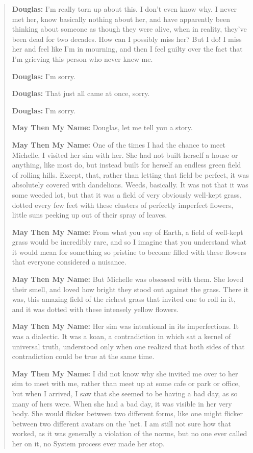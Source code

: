 \begin{quote}
\textbf{Douglas:} I'm really torn up about this. I don't even know why. I never met her, know basically nothing about her, and have apparently been thinking about someone as though they were alive, when in reality, they've been dead for two decades. How can I possibly miss her? But I do! I miss her and feel like I'm in mourning, and then I feel guilty over the fact that I'm grieving this person who never knew me.

\textbf{Douglas:} I'm sorry.

\textbf{Douglas:} That just all came at once, sorry.

\textbf{Douglas:} I'm sorry.

\textbf{May Then My Name:} Douglas, let me tell you a story.

\textbf{May Then My Name:} One of the times I had the chance to meet Michelle, I visited her sim with her. She had not built herself a house or anything, like most do, but instead built for herself an endless green field of rolling hills. Except, that, rather than letting that field be perfect, it was absolutely covered with dandelions. Weeds, basically. It was not that it was some weeded lot, but that it was a field of very obviously well-kept grass, dotted every few feet with these clusters of perfectly imperfect flowers, little suns peeking up out of their spray of leaves.

\textbf{May Then My Name:} From what you say of Earth, a field of well-kept grass would be incredibly rare, and so I imagine that you understand what it would mean for something so pristine to become filled with these flowers that everyone considered a nuisance.

\textbf{May Then My Name:} But Michelle was obsessed with them. She loved their smell, and loved how bright they stood out against the grass. There it was, this amazing field of the richest grass that invited one to roll in it, and it was dotted with these intensely yellow flowers.

\textbf{May Then My Name:} Her sim was intentional in its imperfections. It was a dialectic. It was a koan, a contradiction in which sat a kernel of universal truth, understood only when one realized that both sides of that contradiction could be true at the same time.

\textbf{May Then My Name:} I did not know why she invited me over to her sim to meet with me, rather than meet up at some cafe or park or office, but when I arrived, I saw that she seemed to be having a bad day, as so many of hers were. When she had a bad day, it was visible in her very body. She would flicker between two different forms, like one might flicker between two different avatars on the 'net. I am still not sure how that worked, as it was generally a violation of the norms, but no one ever called her on it, no System process ever made her stop.


\end{quote}
